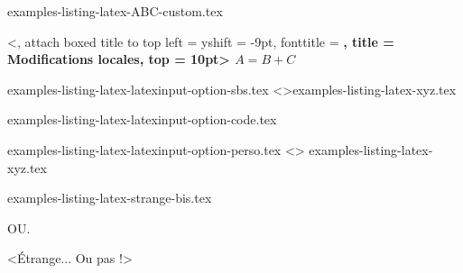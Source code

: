 \begin{filecontents*}[overwrite]{examples-listing-latex-ABC-custom.tex}
\begin{tdoclatex}%
    [linenos, style = igor, showspaces]%
    <,
     attach boxed title to top left = {yshift = -9pt}, 
     fonttitle                      = \bfseries,
     title                          = Modifications locales,
     top                            = 10pt>
$A = B + C$
\end{tdoclatex}
\end{filecontents*}


\begin{filecontents*}[overwrite]{examples-listing-latex-latexinput-option-sbs.tex}
\tdoclatexinput<>{examples-listing-latex-xyz.tex}
\end{filecontents*}


\begin{filecontents*}[overwrite]{examples-listing-latex-latexinput-option-code.tex}
\end{filecontents*}


\begin{filecontents*}[overwrite]{examples-listing-latex-latexinput-option-perso.tex}
\tdoclatexinput[style = igor, showspaces]<>%
               {examples-listing-latex-xyz.tex}
\end{filecontents*}


\begin{filecontents*}[overwrite]{examples-listing-latex-strange-bis.tex}
\begin{tdoclatex}
\end{tdoclatex}
OU.
\begin{tdoclatex}
\string<Étrange... Ou pas !>
\end{tdoclatex}
\end{filecontents*}



\documentclass{tutodoc}

\usepackage[T1]{fontenc}

\usepackage{enumitem}

\usepackage[french]{babel, varioref}

\usepackage{multicol}
\usepackage{tasks}

